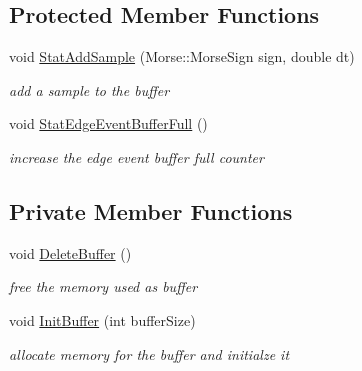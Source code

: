 \subsection*{Protected Member Functions}
\begin{DoxyCompactItemize}
\item 
void \hyperlink{classMorseStatistic_afc0c1198ba34c154ce613591861a339b}{Stat\+Add\+Sample} (Morse\+::\+Morse\+Sign sign, double dt)
\begin{DoxyCompactList}\small\item\em add a sample to the buffer \end{DoxyCompactList}\item 
\mbox{\label{classMorseStatistic_a9caf4881a3a6843aa0aafd1aeaee14e2}} 
void \hyperlink{classMorseStatistic_a9caf4881a3a6843aa0aafd1aeaee14e2}{Stat\+Edge\+Event\+Buffer\+Full} ()
\begin{DoxyCompactList}\small\item\em increase the edge event buffer full counter \end{DoxyCompactList}\end{DoxyCompactItemize}
\subsection*{Private Member Functions}
\begin{DoxyCompactItemize}
\item 
\mbox{\label{classMorseStatistic_a512955d403a9906f15d550e3f731d810}} 
void \hyperlink{classMorseStatistic_a512955d403a9906f15d550e3f731d810}{Delete\+Buffer} ()
\begin{DoxyCompactList}\small\item\em free the memory used as buffer \end{DoxyCompactList}\item 
void \hyperlink{classMorseStatistic_adc79128f3c472bef513ce8546c833834}{Init\+Buffer} (int buffer\+Size)
\begin{DoxyCompactList}\small\item\em allocate memory for the buffer and initialze it \end{DoxyCompactList}\end{DoxyCompactItemize}
